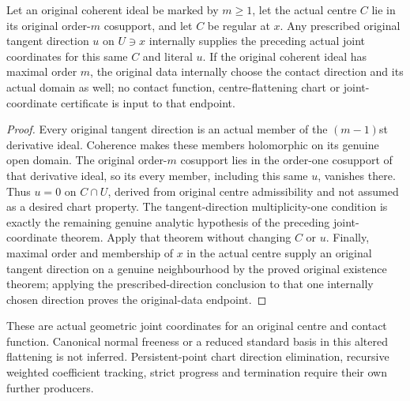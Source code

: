 \begin{theorem}
\label{hir:actual-original-marked-centre-contact-coordinates}
\leanok
Let an original coherent ideal be marked by $m\ge1$, let the actual centre $C$ lie in its original order-$m$ cosupport, and let $C$ be regular at $x$. Any prescribed original tangent direction $u$ on $U\ni x$ internally supplies the preceding actual joint coordinates for this same $C$ and literal $u$. If the original coherent ideal has maximal order $m$, the original data internally choose the contact direction and its actual domain as well; no contact function, centre-flattening chart or joint-coordinate certificate is input to that endpoint.
\end{theorem}
\begin{proof}
Every original tangent direction is an actual member of the $(m-1)$st derivative ideal. Coherence makes these members holomorphic on its genuine open domain. The original order-$m$ cosupport lies in the order-one cosupport of that derivative ideal, so its every member, including this same $u$, vanishes there. Thus $u=0$ on $C\cap U$, derived from original centre admissibility and not assumed as a desired chart property. The tangent-direction multiplicity-one condition is exactly the remaining genuine analytic hypothesis of the preceding joint-coordinate theorem. Apply that theorem without changing $C$ or $u$. Finally, maximal order and membership of $x$ in the actual centre supply an original tangent direction on a genuine neighbourhood by the proved original existence theorem; applying the prescribed-direction conclusion to that one internally chosen direction proves the original-data endpoint.
\end{proof}

\begin{remark}
These are actual geometric joint coordinates for an original centre and contact function. Canonical normal freeness or a reduced standard basis in this altered flattening is not inferred. Persistent-point chart direction elimination, recursive weighted coefficient tracking, strict progress and termination require their own further producers.
\end{remark}
